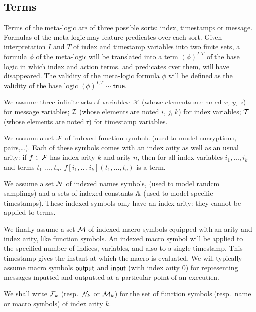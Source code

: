 \subsection{Terms}

Terms of the meta-logic are of three possible sorts: index, timestamps
or message. Formulas of the meta-logic may feature predicates over each sort.
Given interpretation $I$ and $T$ of index and timestamp variables
into two finite sets, a formula $\phi$ of the meta-logic will be translated
into a term $(\phi)^{I,T}$ of the base logic in which index and action terms,
and predicates over them, will have disappeared. The validity of the
meta-logic formula $\phi$ will be defined as the validity of the base logic
$(\phi)^{I,T}\sim\mathsf{true}$.

\medskip

We assume three infinite sets of variables:
$\mathcal{X}$ (whose elements are noted $x$, $y$, $z$) for message variables;
$\mathcal{I}$ (whose elements are noted $i$, $j$, $k$) for index variables;
$\mathcal{T}$ (whose elements are noted $\tau$) for timestamp variables.

We assume a set $\mathcal{F}$ of indexed function symbols
(used to model encryptions, pairs,\dots).
Each of these symbols comes with an index arity as well as an usual arity:
if $f\in\mathcal{F}$ has index arity $k$ and arity $n$,
then for all index variables $i_1,\ldots,i_k$ and terms $t_1,\ldots,t_n$,
$f[i_1,\ldots,i_k](t_1,\ldots,t_n)$ is a term.

We assume a set $\mathcal{N}$ of indexed names symbols,
(used to model random samplings)
and a sets of indexed constants $\mathbb{A}$
(used to model specific timestamps).
These indexed symbols only have an index arity: they
cannot be applied to terms.

We finally assume a set $\mathcal{M}$ of indexed macro symbols
equipped with an arity and index arity, like function symbols.
An indexed macro symbol will be applied to the specified number of
indices, variables, and also to a single timestamp.
This timestamp gives the instant at which the macro is evaluated.
We will typically assume macro symbols $\textsf{output}$ and $\textsf{input}$
(with index arity $0$) for representing messages inputted and outputted
at a particular point of an execution.

We shall write $\mathcal{F}_k$ (resp.\ $\mathcal{N}_k$ or $\mathcal{M}_k$) for the set of function
symbols (resp.\ name or macro symbols) of index arity $k$.

